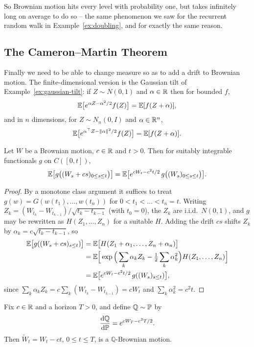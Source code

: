 \documentclass[a4paper]{scrartcl}
\newcommand{\QQ}{\mathbb{Q}}
\newcommand{\dP}{\mathrm{d}\PP}
\newcommand{\dQ}{\mathrm{d}\QQ}
\begin{document}
So Brownian motion hits every level with probability one, but takes infinitely long on average to do so -- the same phenomenon we saw for the recurrent random walk in Example~\ref{ex:doubling}, and for exactly the same reason.

\subsection{The Cameron--Martin Theorem}

Finally we need to be able to change measure so as to add a drift to Brownian motion. The finite-dimensional version is the Gaussian tilt of Example~\ref{ex:gaussian-tilt}: if $Z\sim N(0,1)$ and $\alpha\in\mathbb{R}$ then for bounded $f$,
$$
\mathbb{E}\big[e^{\alpha Z - \alpha^2/2}f(Z)\big] = \mathbb{E}[f(Z+\alpha)],
$$
and in $n$ dimensions, for $Z\sim N_n(0,I)$ and $\alpha\in\mathbb{R}^n$,
$$
\mathbb{E}\big[e^{\alpha^\top Z - \|\alpha\|^2/2}f(Z)\big] = \mathbb{E}[f(Z+\alpha)].
$$

\begin{theorem}\label{thm:cameron-martin}
	Let $W$ be a Brownian motion, $c\in\mathbb{R}$ and $t>0$. Then for suitably integrable functionals $g$ on $C([0,t])$,
	$$
	\mathbb{E}\big[g\big((W_s + cs)_{0\leq s\leq t}\big)\big] = \mathbb{E}\big[e^{cW_t - c^2t/2}\,g\big((W_s)_{0\leq s\leq t}\big)\big].
	$$
\end{theorem}

\begin{proof}
	By a monotone class argument it suffices to treat $g(w) = G(w(t_1),\dots,w(t_n))$ for $0<t_1<\dots<t_n = t$. Writing $Z_k = (W_{t_k}-W_{t_{k-1}})/\sqrt{t_k - t_{k-1}}$ (with $t_0=0$), the $Z_k$ are i.i.d.\ $N(0,1)$, and $g$ may be rewritten as $H(Z_1,\dots,Z_n)$ for a suitable $H$. Adding the drift $cs$ shifts $Z_k$ by $\alpha_k = c\sqrt{t_k - t_{k-1}}$, so
	\begin{align*}
		\mathbb{E}\big[g((W_s+cs)_{s\leq t})\big] &= \mathbb{E}\big[H(Z_1+\alpha_1,\dots,Z_n+\alpha_n)\big]\\
		&= \mathbb{E}\Big[\exp\Big(\sum_k \alpha_kZ_k - \tfrac12\sum_k\alpha_k^2\Big)H(Z_1,\dots,Z_n)\Big]\\
		&= \mathbb{E}\big[e^{cW_t - c^2t/2}\,g((W_s)_{s\leq t})\big],
	\end{align*}
	since $\sum_k\alpha_kZ_k = c\sum_k(W_{t_k}-W_{t_{k-1}}) = cW_t$ and $\sum_k\alpha_k^2 = c^2t$.
\end{proof}

\begin{corollary}\label{cor:girsanov}
	Fix $c \in \mathbb{R}$ and a horizon $T>0$, and define $\QQ\sim\PP$ by
	$$
	\frac{\dQ}{\dP} = e^{cW_T - c^2T/2}.
	$$
	Then $\tilde W_t = W_t - ct$, $0\leq t\leq T$, is a $\QQ$-Brownian motion.
\end{corollary}
\end{document}
